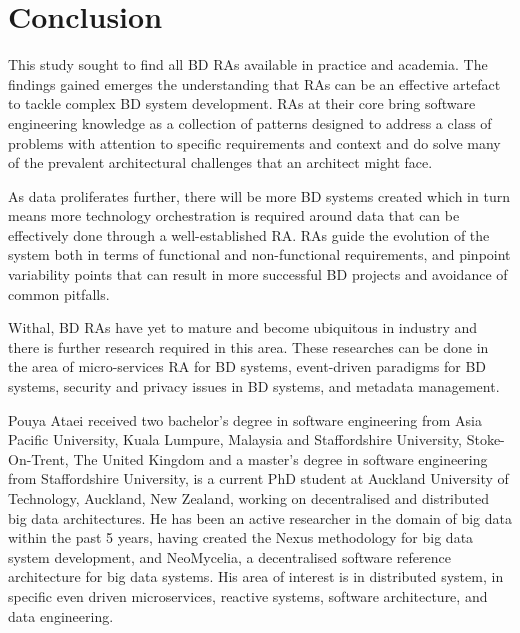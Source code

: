 \documentclass{ieeeaccess}
\begin{document}
\section{Conclusion}

This study sought to find all BD RAs available in practice and academia. The findings gained emerges the understanding that RAs can be an effective artefact to tackle complex BD system development. RAs at their core bring software engineering knowledge as a collection of patterns designed to address a class of problems with attention to specific requirements and context and do solve many of the prevalent architectural challenges that an architect might face. 

As data proliferates further, there will be more BD systems created which in turn means more technology orchestration is required around data that can be effectively done through a well-established RA. RAs guide the evolution of the system both in terms of functional and non-functional requirements, and pinpoint variability points that can result in more successful BD projects and avoidance of common pitfalls. 

Withal, BD RAs have yet to mature and become ubiquitous in industry and there is further research required in this area. These researches can be done in the area of micro-services RA for BD systems, event-driven paradigms for BD systems, security and privacy issues in BD systems, and metadata management.





\begin{IEEEbiography}{Pouya Ataei} received two bachelor's degree in software engineering from Asia Pacific University, Kuala Lumpure, Malaysia and Staffordshire University, Stoke-On-Trent, The United Kingdom and a master's degree in software engineering from Staffordshire University, is a current PhD student at Auckland University of Technology, Auckland, New Zealand, working on decentralised and distributed big data architectures. He has been an active researcher in the domain of big data within the past 5 years, having created the Nexus methodology for big data system development, and NeoMycelia, a decentralised software reference architecture for big data systems. His area of interest is in distributed system, in specific even driven microservices, reactive systems, software architecture, and data engineering. \end{IEEEbiography}
 
\end{document}
